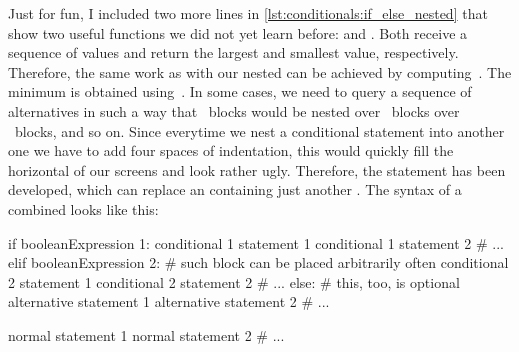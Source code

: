 Just for fun, I included two more lines in \cref{lst:conditionals:if_else_nested} that show two useful functions we did not yet learn before:
 and .
Both receive a sequence of values and return the largest and smallest value, respectively.
Therefore, the same work as with our nested  can be achieved by computing~.
The minimum is obtained using~.%
\FloatBarrier%
\endhsection%
%
%
%
%
%
%
%
%
%
%
%
%
%
In some cases, we need to query a sequence of alternatives in such a way that ~blocks would be nested over ~blocks over ~blocks, and so on.
Since everytime we nest a conditional statement into another one we have to add four spaces of indentation, this would quickly fill the horizontal of our screens and look rather ugly.
Therefore, the  statement has been developed, which can replace an  containing just another .
The syntax of a combined  looks like this:%
%
\begin{pythonSyntax}
if booleanExpression 1:
    conditional 1 statement 1
    conditional 1 statement 2
    # ...
elif booleanExpression 2:  # such block can be placed arbitrarily often
    conditional 2 statement 1
    conditional 2 statement 2
    # ...
else:  # this, too, is optional
    alternative statement 1
    alternative statement 2
    # ...

normal statement 1
normal statement 2
# ...
\end{pythonSyntax}
